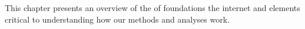 This chapter presents an overview of the of foundations the internet and elements critical to understanding how our methods and analyses work. %

